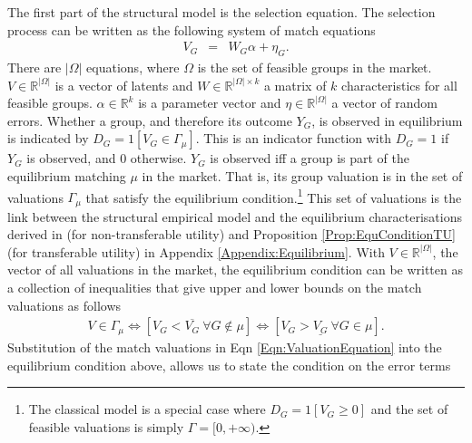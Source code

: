 The first part of the structural model is the selection equation. The selection process can be written as the following system of match equations
\begin{eqnarray} \label{Eqn:ValuationEquation}
V_G &=& W_G\alpha + \eta_G.
\end{eqnarray}
There are $|\Omega|$ equations, where $\Omega$ is the set of feasible groups in the market. $V \in \mathbb R^{|\Omega|}$ is a vector of latents and $W \in \mathbb R^{|\Omega|\times k}$ a matrix of $k$ characteristics for all feasible groups. $\alpha \in \mathbb R^k$ is a parameter vector and $\eta \in \mathbb R^{|\Omega|}$ a vector of random errors. 
Whether a group, and therefore its outcome $Y_G$, is observed in equilibrium is indicated by $D_G = 1\left[ V_G \in \Gamma_{\mu} \right]$. This is an indicator function with $D_G=1$ if $Y_G$ is observed, and 0 otherwise. $Y_G$ is observed iff a group is part of the equilibrium matching $\mu$ in the market. That is, its group valuation is in the set of valuations $\Gamma_{\mu}$ that satisfy the equilibrium condition.\footnote{The classical \citet{Heckman1979} model is a special case where $D_G=1[V_G\geq 0]$ and the set of feasible valuations is simply $\Gamma = [0,+\infty )$.}
This set of valuations is the link between the structural empirical model and the equilibrium characterisations derived in \citet{Klein2015a} (for non-transferable utility) and Proposition \ref{Prop:EquConditionTU} (for transferable utility) in Appendix \ref{Appendix:Equilibrium}. 
With $V \in \mathbb R^{|\Omega|}$, the vector of all valuations in the market, %
the equilibrium condition can be written as a collection of inequalities that give upper and lower bounds on the match valuations as follows
\begin{eqnarray} \label{PropositionNTU}
V \in \Gamma_{\mu} \Leftrightarrow \left[ V_G < \overline{V_G} \ \forall G \notin \mu \right] \Leftrightarrow \left[ V_G > \underline{V_G} \ \forall G \in \mu \right].
\end{eqnarray}
Substitution of the match valuations in Eqn \ref{Eqn:ValuationEquation} into the equilibrium condition above, allows us to state the condition on the error terms
